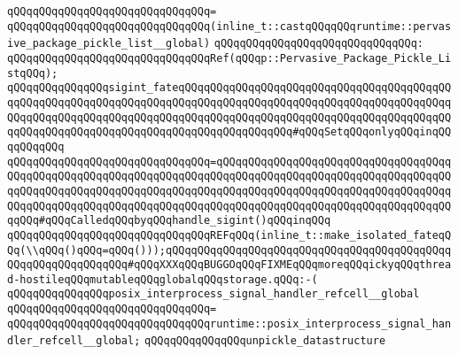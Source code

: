 \verb|qQQqqQQqqQQqqQQqqQQqqQQqqQQqqQQq=|\newline
\verb|qQQqqQQqqQQqqQQqqQQqqQQqqQQqqQQq(inline_t::castqQQqqQQqruntime::pervasive_package_pickle_list__global)|\newline
\verb|qQQqqQQqqQQqqQQqqQQqqQQqqQQqqQQq:|\newline
\verb|qQQqqQQqqQQqqQQqqQQqqQQqqQQqqQQqRef(qQQqp::Pervasive_Package_Pickle_ListqQQq);|\newline
\newline
\newline
\verb|qQQqqQQqqQQqqQQqsigint_fateqQQqqQQqqQQqqQQqqQQqqQQqqQQqqQQqqQQqqQQqqQQqqQQqqQQqqQQqqQQqqQQqqQQqqQQqqQQqqQQqqQQqqQQqqQQqqQQqqQQqqQQqqQQqqQQqqQQqqQQqqQQqqQQqqQQqqQQqqQQqqQQqqQQqqQQqqQQqqQQqqQQqqQQqqQQqqQQqqQQqqQQqqQQqqQQqqQQqqQQqqQQqqQQqqQQqqQQqqQQqqQQqqQQq#qQQqSetqQQqonlyqQQqinqQQqqQQqqQQq|\newline
\verb|qQQqqQQqqQQqqQQqqQQqqQQqqQQqqQQq=qQQqqQQqqQQqqQQqqQQqqQQqqQQqqQQqqQQqqQQqqQQqqQQqqQQqqQQqqQQqqQQqqQQqqQQqqQQqqQQqqQQqqQQqqQQqqQQqqQQqqQQqqQQqqQQqqQQqqQQqqQQqqQQqqQQqqQQqqQQqqQQqqQQqqQQqqQQqqQQqqQQqqQQqqQQqqQQqqQQqqQQqqQQqqQQqqQQqqQQqqQQqqQQqqQQqqQQqqQQqqQQqqQQqqQQqqQQqqQQqqQQqqQQqqQQq#qQQqCalledqQQqbyqQQqhandle_sigint()qQQqinqQQq|\newline
\verb|qQQqqQQqqQQqqQQqqQQqqQQqqQQqqQQqREFqQQq(inline_t::make_isolated_fateqQQq(\\qQQq()qQQq=qQQq()));qQQqqQQqqQQqqQQqqQQqqQQqqQQqqQQqqQQqqQQqqQQqqQQqqQQqqQQqqQQqqQQq#qQQqXXXqQQqBUGGOqQQqFIXMEqQQqmoreqQQqickyqQQqthread-hostileqQQqmutableqQQqglobalqQQqstorage.qQQq:-(|\newline
\newline
\newline
\verb|qQQqqQQqqQQqqQQqposix_interprocess_signal_handler_refcell__global|\newline
\verb|qQQqqQQqqQQqqQQqqQQqqQQqqQQqqQQq=|\newline
\verb|qQQqqQQqqQQqqQQqqQQqqQQqqQQqqQQqruntime::posix_interprocess_signal_handler_refcell__global;|\newline
\newline
\newline
\newline
\verb|qQQqqQQqqQQqqQQqunpickle_datastructure|\newline

